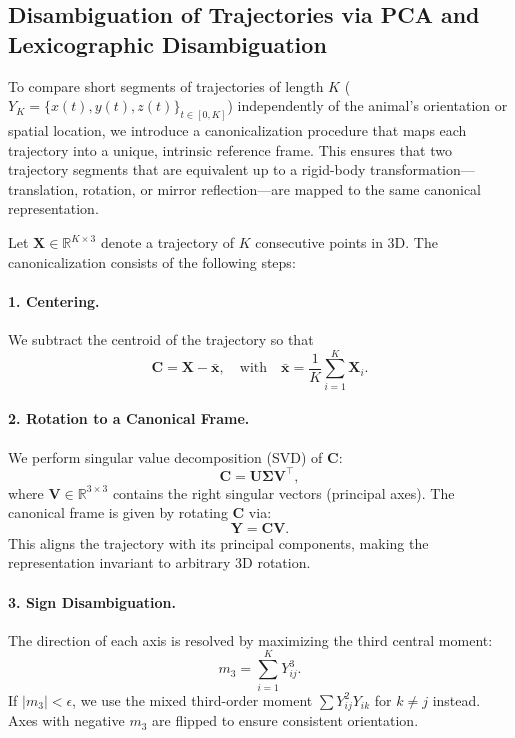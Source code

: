 \subsection{Disambiguation of Trajectories via PCA and Lexicographic Disambiguation}
\label{sec:disambiguation}
To compare short segments of trajectories of length $K$ ($Y_K = \{x(t),y(t),z(t)\}_{t\in[0,K]}$) independently of the animal's orientation or spatial location, we introduce a canonicalization procedure that maps each trajectory into a unique, intrinsic reference frame. This ensures that two trajectory segments that are equivalent up to a rigid-body transformation—translation, rotation, or mirror reflection—are mapped to the same canonical representation.

Let $\mathbf{X} \in \mathbb{R}^{K \times 3}$ denote a trajectory of $K$ consecutive points in 3D. The canonicalization consists of the following steps:

\paragraph{1. Centering.} We subtract the centroid of the trajectory so that
\[
\mathbf{C} = \mathbf{X} - \bar{\mathbf{x}}, \quad \text{with} \quad \bar{\mathbf{x}} = \frac{1}{K} \sum_{i=1}^{K} \mathbf{X}_i.
\]

\paragraph{2. Rotation to a Canonical Frame.} We perform singular value decomposition (SVD) of $\mathbf{C}$:
\[
\mathbf{C} = \mathbf{U} \boldsymbol{\Sigma} \mathbf{V}^\top,
\]
where $\mathbf{V} \in \mathbb{R}^{3 \times 3}$ contains the right singular vectors (principal axes). The canonical frame is given by rotating $\mathbf{C}$ via:
\[
\mathbf{Y} = \mathbf{C} \mathbf{V}.
\]
This aligns the trajectory with its principal components, making the representation invariant to arbitrary 3D rotation.

\paragraph{3. Sign Disambiguation.} The direction of each axis is resolved by maximizing the third central moment:
\[
m_3 = \sum_{i=1}^{K} Y_{ij}^3.
\]
If $|m_3| < \epsilon$, we use the mixed third-order moment $\sum Y_{ij}^2 Y_{ik}$ for $k \neq j$ instead. Axes with negative $m_3$ are flipped to ensure consistent orientation.

